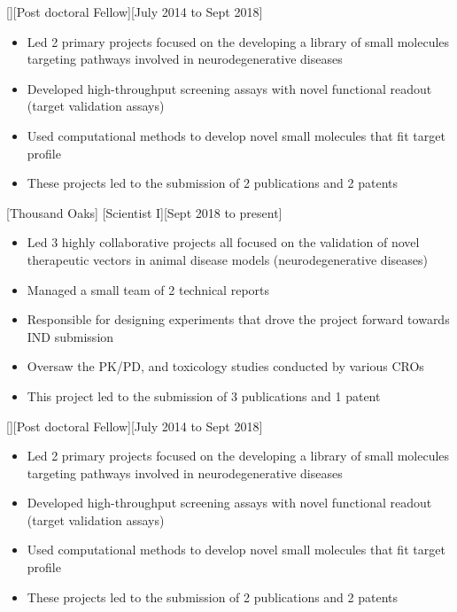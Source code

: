 \documentclass{article}
\begin{document}
[][Post doctoral Fellow][July 2014 to Sept 2018]

\begin{itemize}
\item Led 2 primary projects focused on the developing a library of small molecules targeting pathways involved in neurodegenerative diseases
\item Developed high-throughput screening assays with novel functional readout (target validation assays)
\item Used computational methods to develop novel small molecules that fit target profile
\item These projects led to the submission of 2 publications and 2 patents
\end{itemize}

[Thousand Oaks]
[Scientist I][Sept 2018 to present]

\begin{itemize}
\item Led 3 highly collaborative projects all focused on the validation of novel therapeutic vectors in animal disease models (neurodegenerative diseases)
\item Managed a small team of 2 technical reports
\item Responsible for designing experiments that drove the project forward towards IND submission
\item Oversaw the PK/PD, and toxicology studies conducted by various CROs
\item This project led to the submission of 3 publications and 1 patent
\end{itemize}

[][Post doctoral Fellow][July 2014 to Sept 2018]

\begin{itemize}
\item Led 2 primary projects focused on the developing a library of small molecules targeting pathways involved in neurodegenerative diseases
\item Developed high-throughput screening assays with novel functional readout (target validation assays)
\item Used computational methods to develop novel small molecules that fit target profile
\item These projects led to the submission of 2 publications and 2 patents
\end{itemize}
\end{document}
